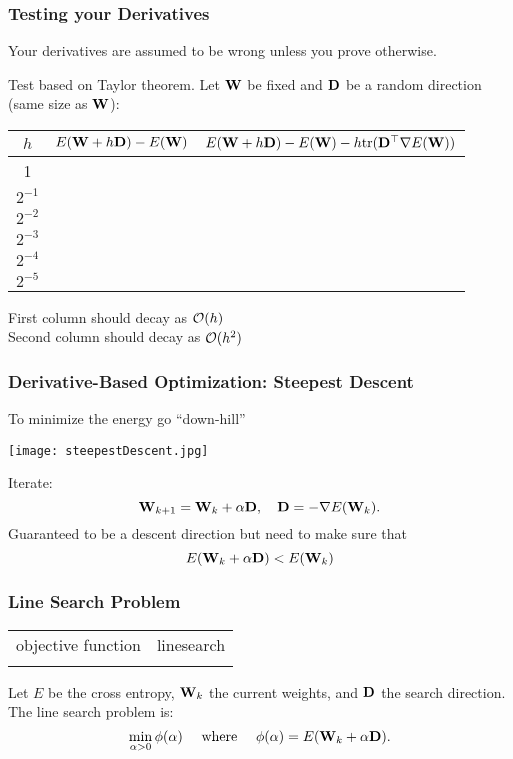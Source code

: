 \documentclass[12pt,fleqn,handout]{beamer}
\begin{document}
\begin{frame}[fragile]\frametitle{Testing your Derivatives}

Your derivatives are assumed to be wrong unless you prove otherwise.

Test based on Taylor theorem. Let ${\bf W}$ be fixed and ${\bf D}$ be a random direction (same size as ${\bf W}$):

{\begin{small}
\begin{center}
\begin{tabular}{c|c|c}
 $h$  & $E({\bf W} + h{\bf D}) -    E({\bf W})$ &  $E({\bf W} + h{\bf D}) -    E({\bf W}) - h {\rm tr}({\bf D}^{\top} \nabla E({\bf W}))$ \\
 \hline
 1   &   &   \\
 $2^{-1}$   &   &   \\
 $2^{-2}$   &   &   \\
 $2^{-3}$   &   &   \\
 $2^{-4}$   &   &   \\
 $2^{-5}$   &   &
 \end{tabular}
 \end{center}
 \end{small}}


\pause

First column should decay as ${\cal O}(h)$ \\
Second column should decay as ${\cal O}(h^2)$ \\


\end{frame}



\begin{frame}\frametitle{Derivative-Based Optimization: Steepest Descent}


To minimize the energy go ``down-hill''
\begin{center}
	\texttt{[image: steepestDescent.jpg]}
\end{center}

Iterate:
$$ {\bf W}_{k+1} = {\bf W}_k + \alpha {\bf D}, \quad {\bf D} =  -\nabla E({\bf W}_k). $$
Guaranteed to be a descent direction but need to make sure that
$$ E({\bf W}_k + \alpha {\bf D}) < E({\bf W}_k)  $$

\end{frame}

\begin{frame}
	\frametitle{Line Search Problem}
	\begin{center}
		\iwidth=40mm
		\iheight=30mm
		\begin{tabular}{cc}
			objective function
			&
			linesearch
			\\
			\scriptsize
			
			&
			\scriptsize
			
		\end{tabular}
	\end{center}
	Let $E$ be the cross entropy, ${\bf W}_k$ the current weights, and ${\bf D}$ the search direction.  The line search problem is:
	\begin{equation*}
		\min_{\alpha > 0} \phi(\alpha) \quad \text{ where } \quad \phi(\alpha) = E({\bf W}_k + \alpha {\bf D}).
	\end{equation*}
\end{frame}
\end{document}
